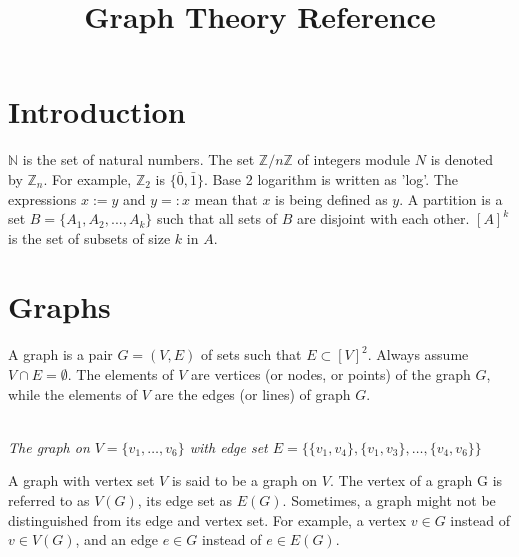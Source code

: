 \documentclass{article}
\title{Graph Theory Reference}
\begin{document}
\maketitle
\section{Introduction}
$\mathbb{N}$ is the set of natural numbers.
The set $\mathbb{Z}/n\mathbb{Z}$ of integers
module $N$ is denoted by $\mathbb{Z}_n$.
For example, $\mathbb{Z}_2$ is
$\{\bar{0}, \bar{1}\}$. Base 2 logarithm is
written as 'log'. The expressions $x := y$ and
$y =: x$ mean that $x$ is being defined as $y$.
A partition is a set
$B = \{A_1, A_2, ..., A_k\}$ such that all sets
of $B$ are disjoint with each other. $[A]^{k}$
is the set of subsets of size $k$ in $A$.
\section{Graphs}

A graph is a pair $G = (V, E)$ of sets such
that $E \subset [V]^2$. Always assume
$V \cap E = \emptyset$. The elements of $V$ are
vertices (or nodes, or points) of the graph $G$,
while the elements of $V$ are the edges
(or lines) of graph $G$.

\begin{center}
    \\
    \emph{The graph on $V = \{v_1, \ldots, v_6\}$
        with edge set
        $E = \{\{v_1, v_4\}, \{v_1, v_3\}
            , \ldots, \{v_4, v_6\}\}$}
\end{center}

A graph with vertex set $V$ is said to be a graph
on $V$. The vertex of a graph G is referred to as
$V(G)$, its edge set as $E(G)$. Sometimes, a graph
might not be distinguished from its edge and vertex
set. For example, a vertex $v \in G$ instead of
$v \in V(G)$, and an edge $e \in G$ instead of
$e \in E(G)$.
\end{document}

